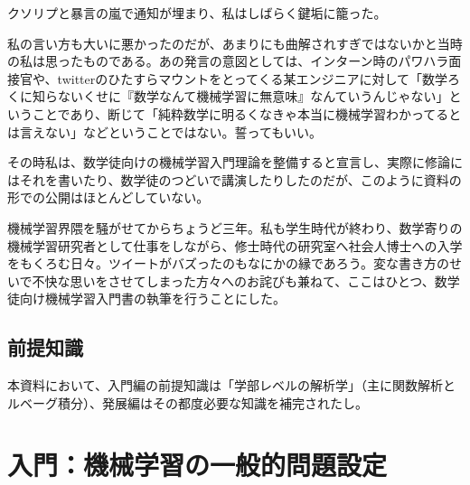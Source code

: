 \documentclass{jsarticle}
\begin{document}
クソリプと暴言の嵐で通知が埋まり、私はしばらく鍵垢に籠った。

私の言い方も大いに悪かったのだが、あまりにも曲解されすぎではないかと当時の私は思ったものである。あの発言の意図としては、インターン時のパワハラ面接官や、twitterのひたすらマウントをとってくる某エンジニアに対して「数学ろくに知らないくせに『数学なんて機械学習に無意味』なんていうんじゃない」ということであり、断じて「純粋数学に明るくなきゃ本当に機械学習わかってるとは言えない」などということではない。誓ってもいい。

その時私は、数学徒向けの機械学習入門理論を整備すると宣言し、実際に修論にはそれを書いたり、数学徒のつどいで講演したりしたのだが、このように資料の形での公開はほとんどしていない。

機械学習界隈を騒がせてからちょうど三年。私も学生時代が終わり、数学寄りの機械学習研究者として仕事をしながら、修士時代の研究室へ社会人博士への入学をもくろむ日々。ツイートがバズったのもなにかの縁であろう。変な書き方のせいで不快な思いをさせてしまった方々へのお詫びも兼ねて、ここはひとつ、数学徒向け機械学習入門書の執筆を行うことにした。

\subsection{前提知識}
本資料において、入門編の前提知識は「学部レベルの解析学」（主に関数解析とルベーグ積分）、発展編はその都度必要な知識を補完されたし。


\newpage

\section{入門：機械学習の一般的問題設定}

\newpage
\begin{thebibliography}{99}
\end{thebibliography}
\end{document}
